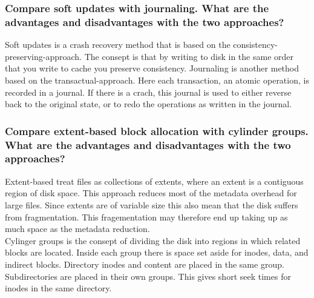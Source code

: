 \documentclass{article}
\begin{document}
\subsubsection*{Compare soft updates with journaling. What are the advantages and disadvantages with the
two approaches?}
Soft updates is a crash recovery method that is based on the consistency-preserving-approach. The consept is that by writing to disk in the same order that you write to cache you preserve consistency. Journaling is another method based on the transactual-approach. Here each transaction, an atomic operation, is recorded in a journal. If there is a crach, this journal is used to either reverse back to the original state, or to redo the operations as written in the journal.
\subsubsection*{Compare extent-based block allocation with cylinder groups. What are the advantages and
disadvantages with the two approaches?}
Extent-based treat files as collections of extents, where an extent is a contiguous region of disk space. This approach reduces most of the metadata overhead for large files. Since extents are of variable size this also mean that the disk suffers from fragmentation. This fragementation may therefore end up taking up as much space as the metadata reduction.
\\
Cylinger groups is the consept of dividing the disk into regions in which related blocks are located. Inside each group there is space set aside for inodes, data, and indirect blocks. Directory inodes and content are placed in the same group. Subdirectories are placed in their own groups. This gives short seek times for inodes in the same directory.
\end{document}
